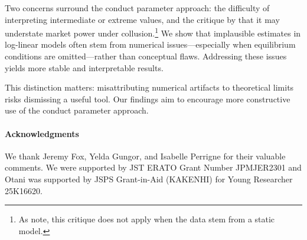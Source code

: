 \documentclass[11pt, a4paper]{article}
\theoremstyle{remark}
\begin{document}

Two concerns surround the conduct parameter approach: the difficulty of interpreting intermediate or extreme values, and the critique by \citet{corts1999conduct} that it may understate market power under collusion.\footnote{As \citet{magnolfi2022comparison} note, this critique does not apply when the data stem from a static model.}
We show that implausible estimates in log-linear models often stem from numerical issues—especially when equilibrium conditions are omitted—rather than conceptual flaws. 
Addressing these issues yields more stable and interpretable results.

This distinction matters: misattributing numerical artifacts to theoretical limits risks dismissing a useful tool. Our findings aim to encourage more constructive use of the conduct parameter approach.



\paragraph{Acknowledgments}
We thank Jeremy Fox, Yelda Gungor, and Isabelle Perrigne for their valuable comments. %
We were supported by JST ERATO Grant Number JPMJER2301 and Otani was supported by JSPS Grant-in-Aid (KAKENHI) for Young Researcher 25K16620.
\end{document}
